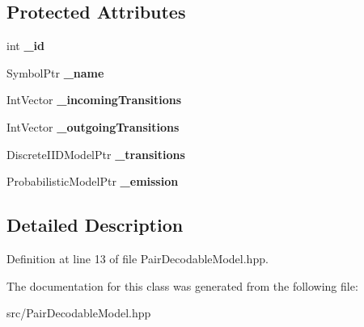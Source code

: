 \subsection*{Protected Attributes}
\begin{DoxyCompactItemize}
\item 
\mbox{\label{classtops_1_1PairDecodableState_a1ba086b631bfdbae7e1fc70b6890e5ec}} 
int {\bfseries \+\_\+id}
\item 
\mbox{\label{classtops_1_1PairDecodableState_a9f57b629325d94d691b6aff04ade8cf8}} 
Symbol\+Ptr {\bfseries \+\_\+name}
\item 
\mbox{\label{classtops_1_1PairDecodableState_aa22b0b34c30ec4c6eeb8b4f8d757a652}} 
Int\+Vector {\bfseries \+\_\+incoming\+Transitions}
\item 
\mbox{\label{classtops_1_1PairDecodableState_a2947a7c78a40c64572d7bff3ba2ec5c4}} 
Int\+Vector {\bfseries \+\_\+outgoing\+Transitions}
\item 
\mbox{\label{classtops_1_1PairDecodableState_a91be8461d00509acbecbaa9acd25296d}} 
Discrete\+I\+I\+D\+Model\+Ptr {\bfseries \+\_\+transitions}
\item 
\mbox{\label{classtops_1_1PairDecodableState_a10749ca44d6ed7efe5fd1539e68286c4}} 
Probabilistic\+Model\+Ptr {\bfseries \+\_\+emission}
\end{DoxyCompactItemize}


\subsection{Detailed Description}


Definition at line 13 of file Pair\+Decodable\+Model.\+hpp.



The documentation for this class was generated from the following file\+:\begin{DoxyCompactItemize}
\item 
src/Pair\+Decodable\+Model.\+hpp\end{DoxyCompactItemize}
